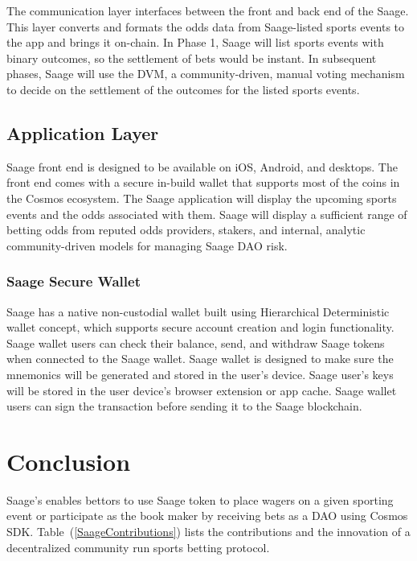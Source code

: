 \documentclass[%
 aapm,
 mph,%
 amsmath,amssymb,
 reprint,%
]{revtex4-2}
\begin{document}
The communication layer interfaces between the front and back end of the Saage. This layer converts and formats the odds data from Saage-listed sports events to the app and brings it on-chain. In Phase 1, Saage will list sports events with binary outcomes, so the settlement of bets would be instant. In subsequent phases, Saage will use the DVM, a community-driven, manual voting mechanism to decide on the settlement of the outcomes for the listed sports events. 

\subsection{Application Layer} 

Saage front end is designed to be available on iOS, Android, and desktops. The front end comes with a secure in-build wallet that supports most of the coins in the Cosmos ecosystem. The Saage application will display the upcoming sports events and the odds associated with them. Saage will display a sufficient range of betting odds from reputed odds providers, stakers, and internal, analytic community-driven models for managing Saage DAO risk. 

\subsubsection{Saage Secure Wallet}\label{SaageSecureWallet}

Saage has a native non-custodial wallet built using Hierarchical Deterministic wallet concept, which supports secure account creation and login functionality. Saage wallet users can check their balance, send, and withdraw Saage tokens when connected to the Saage wallet. Saage wallet is designed to make sure the mnemonics will be generated and stored in the user’s device. Saage user’s keys will be stored in the user device’s browser extension or app cache. Saage wallet users can sign the transaction before sending it to the Saage blockchain.

\section{Conclusion}

Saage’s enables bettors to use Saage token to place wagers on a given sporting event or participate as the book maker by receiving bets as a DAO using Cosmos SDK.  Table~(\ref{SaageContributions}) lists the contributions and the innovation of a decentralized community run sports betting protocol.
\end{document}
